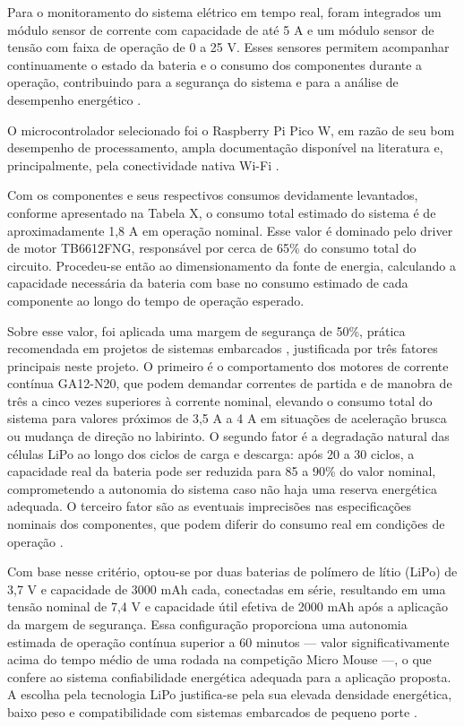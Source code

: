 Para o monitoramento do sistema elétrico em tempo real, foram integrados um 
módulo sensor de corrente com capacidade de até 5 A e um módulo sensor de 
tensão com faixa de operação de 0 a 25 V. Esses sensores permitem acompanhar 
continuamente o estado da bateria e o consumo dos componentes durante a 
operação, contribuindo para a segurança do sistema e para a análise de 
desempenho energético \cite{rashid2014}.

O microcontrolador selecionado foi o Raspberry Pi Pico W, em razão de seu bom 
desempenho de processamento, ampla documentação disponível na literatura e, 
principalmente, pela conectividade nativa Wi-Fi \cite{feitosa2025}.

Com os componentes e seus respectivos consumos devidamente levantados, 
conforme apresentado na Tabela X, o consumo total estimado do sistema é de 
aproximadamente 1,8 A em operação nominal. Esse valor é dominado pelo driver 
de motor TB6612FNG, responsável por cerca de 65\% do consumo total do circuito. 
Procedeu-se então ao dimensionamento da fonte de energia, calculando a 
capacidade necessária da bateria com base no consumo estimado de cada 
componente ao longo do tempo de operação esperado.

Sobre esse valor, foi aplicada uma margem de segurança de 50\%, prática 
recomendada em projetos de sistemas embarcados \cite{rashid2014}, justificada por 
três fatores principais neste projeto. O primeiro é o comportamento dos motores de 
corrente contínua GA12-N20, que podem demandar correntes de partida e de 
manobra de três a cinco vezes superiores à corrente nominal, elevando o consumo 
total do sistema para valores próximos de 3,5 A a 4 A em situações de aceleração 
brusca ou mudança de direção no labirinto. O segundo fator é a degradação natural 
das células LiPo ao longo dos ciclos de carga e descarga: após 20 a 30 ciclos, a 
capacidade real da bateria pode ser reduzida para 85 a 90\% do valor nominal, 
comprometendo a autonomia do sistema caso não haja uma reserva energética 
adequada. O terceiro fator são as eventuais imprecisões nas especificações 
nominais dos componentes, que podem diferir do consumo real em condições de 
operação \cite{rashid2014}.

Com base nesse critério, optou-se por duas baterias de polímero de lítio (LiPo) de 
3,7 V e capacidade de 3000 mAh cada, conectadas em série, resultando em uma 
tensão nominal de 7,4 V e capacidade útil efetiva de 2000 mAh após a aplicação da 
margem de segurança. Essa configuração proporciona uma autonomia estimada 
de operação contínua superior a 60 minutos — valor significativamente acima do 
tempo médio de uma rodada na competição Micro Mouse —, o que confere ao 
sistema confiabilidade energética adequada para a aplicação proposta. A escolha 
pela tecnologia LiPo justifica-se pela sua elevada densidade energética, baixo peso 
e compatibilidade com sistemas embarcados de pequeno porte \cite{feitosa2025}.


